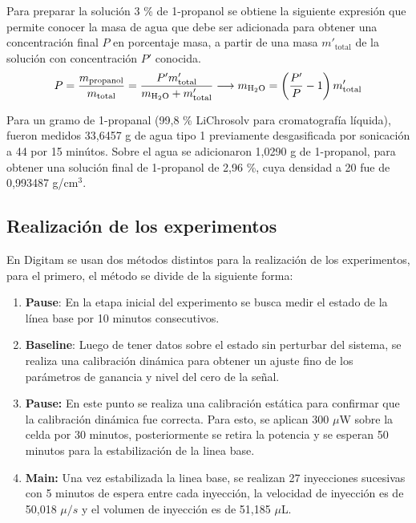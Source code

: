 	Para preparar la soluci\'on 3 \% de 1-propanol se obtiene la siguiente expresi\'on que permite conocer la masa de agua que debe ser adicionada para obtener una concentraci\'on final $P$ en porcentaje masa, a partir de una masa $m'_\text{total}$ de la soluci\'on con concentraci\'on $P'$ conocida.
	\begin{equation}\label{eq: massConcentration}
		P = \dfrac{m_\text{propanol}}{m_\text{total}} = \dfrac{P'm'_\text{total}}{m_\text{\ce{H2O}} + m'_\text{total}} \longrightarrow m_\text{\ce{H2O}} = \left(\dfrac{P'}{P} -1\right)m'_\text{total}
	\end{equation}
	
	Para un gramo de 1-propanal (99,8 \% LiChrosolv para cromatograf\'ia l\'iquida), fueron medidos 33,6457 g de agua tipo 1 previamente desgasificada por sonicaci\'on a 44 \grad{} por 15 min\'utos. Sobre el agua se adicionaron 1,0290 g de 1-propanol, para obtener una soluci\'on final de 1-propanol de 2,96 \%, cuya densidad a 20 \grad{} fue de 0,993487 g/cm$^3$.
	
	\subsection{Realizaci\'on de los experimentos}\label{sec: method}
	En Digitam se usan dos m\'etodos distintos para la realizaci\'on de los experimentos, para el primero, el m\'etodo se divide de la siguiente forma:
	\begin{enumerate}
		\item \textbf{Pause}: En la etapa inicial del experimento se busca medir el estado de la línea base por 10 minutos consecutivos.
		\item \textbf{Baseline}: Luego de tener datos sobre el estado sin perturbar del sistema, se realiza una calibración dinámica para obtener un ajuste fino de los parámetros de ganancia y nivel del cero de la señal. 
		\item \textbf{Pause:} En este punto se realiza una calibraci\'on est\'atica para confirmar que la calibraci\'on din\'amica fue correcta. Para esto, se aplican 300 $\mu$W sobre la celda por 30 minutos, posteriormente se retira la potencia y se esperan 50 minutos para la estabilizaci\'on de la linea base.
		\item \textbf{Main:} Una vez estabilizada la linea base, se realizan 27 inyecciones sucesivas con 5 minutos de espera entre cada inyecci\'on, la velocidad de inyecci\'on es de 50,018 $\mu/s$ y el volumen de inyecci\'on es de 51,185 $\mu$L.
	\end{enumerate}
	

